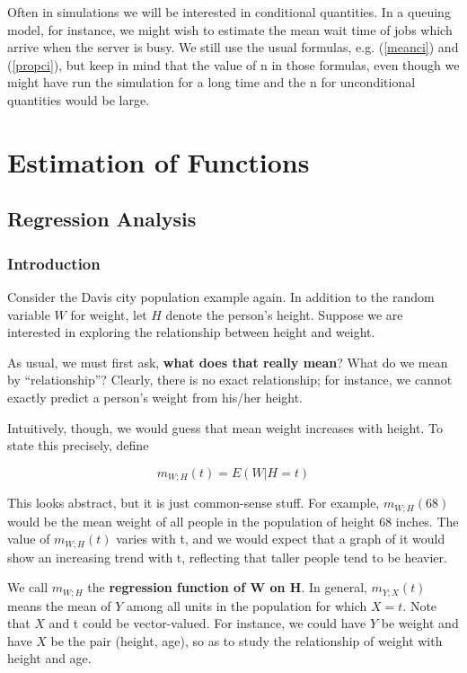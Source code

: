 Often in simulations we will be interested in conditional quantities.
In a queuing model, for instance, we might wish to estimate
the mean wait time of jobs which arrive when the server is busy.
We still use the usual formulas, e.g. (\ref{meanci}) and (\ref{propci}),
but keep in mind that the value of n in those formulas, even though we
might have run the simulation for a long time and the n for
unconditional quantities would be large.

\section{Estimation of Functions}

\subsection{Regression Analysis}

\subsubsection{Introduction}
\label{regintro}

Consider the Davis city population example again.  In addition to the
random variable $W$ for weight, let $H$ denote the person's height.
Suppose we are interested in exploring the relationship between height
and weight.

As usual, we must first ask, {\bf what does that really mean}?  What do
we mean by ``relationship''?  Clearly, there is no exact relationship;
for instance, we cannot exactly predict a person's weight from his/her
height.

Intuitively, though, we would guess that mean weight increases with
height.  To state this precisely, define

\begin{equation}
m_{W;H}(t) = E(W|H = t)
\end{equation}

This looks abstract, but it is just common-sense stuff.  For example,
$m_{W;H}(68)$ would be the mean weight of all people in the population
of height 68 inches.  The value of $m_{W;H}(t)$ varies with t, and we
would expect that a graph of it would show an increasing trend with t,
reflecting that taller people tend to be heavier.  

We call $m_{W;H}$ the {\bf regression function of W on H}.  In general,
$m_{Y;X}(t)$ means the mean of $Y$ among all units in the population for
which $X = t$.  Note that $X$ and t could be vector-valued.  For
instance, we could have $Y$ be weight and have $X$ be the pair (height,
age), so as to study the relationship of weight with height and age.

